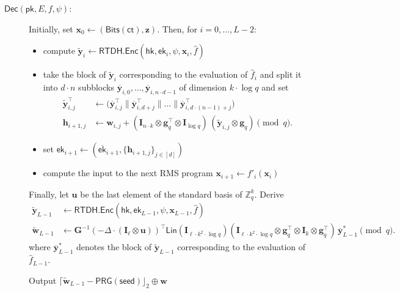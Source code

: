 \documentclass{article}
\newcommand{\ek}{\mathsf{ek}}
\newcommand{\Z}{\mathbb{Z}}
\newcommand{\ct}{\mathsf{ct}}
\newcommand{\RTDH}{\mathsf{RTDH}}
\newcommand{\algofont}[1]{\ensuremath{\mathsf{#1}}}
\newcommand{\Enc}{{\algofont{Enc}}}
\newcommand{\Dec}{{\algofont{Dec}}}
\newcommand{\id}{\ensuremath{\mathbf{I}}}
\newcommand{\pk}{{\mathsf{pk}}}
\newcommand{\hk}{\ensuremath{\mathsf{hk}}}
\newenvironment{protocol}[1][]
{\begin{algorithm}\caption{#1}}
  {\end{algorithm}}
\begin{document}
\begin{protocol}[(cont.)]
\begin{description}
\item[$\Dec(\pk, E, f, \psi)$:]
Initially, set $\mathbf{x}_0\gets (\mathsf{Bits}(\ct), \mathbf{z})$.
Then, for $i=0, \dots, L-2$: 
\begin{itemize}
\item compute $\tilde{\mathbf{y}}_i\gets\RTDH.\Enc(\hk, \ek_i, \psi, \mathbf{x}_i, \hat{f})$
\item take the block of $\tilde{\mathbf{y}}_{i}$ corresponding to the evaluation of $\hat{f}_i$ and split it into $d\cdot n$ subblocks $\overline{\mathbf{y}}_{i, 0}, \dots, \overline{\mathbf{y}}_{i, n\cdot d-1}$ of dimension $k\cdot \log q$ and set
\begin{align*}
\tilde{\mathbf{y}}_{i, j}^\intercal&\gets \bigl(\overline{\mathbf{y}}_{i, j}^\intercal \mathbin{\|} \overline{\mathbf{y}}_{i, d+j}^\intercal \mathbin{\|}\dots \mathbin{\|} \overline{\mathbf{y}}_{i, d\cdot (n-1)+j}^\intercal\bigr)\\
\mathbf{h}_{i+1,j}&\gets \mathbf{w}_{i,j} +(\id_{n\cdot k}\otimes \mathbf{g}_q^\intercal\otimes \id_{\log q})\,(\tilde{\mathbf{y}}_{i,j}\otimes \mathbf{g}_q)\pmod q.\end{align*}
\item set $\ek_{i+1}\gets(\overline{\ek}_{i+1}, \{\mathbf{h}_{i+1, j}\}_{j\in[d]})$
\item compute the input to the next RMS program $\mathbf{x}_{i+1}\gets f'_i(\mathbf{x}_i)$
\end{itemize}
Finally, let $\mathbf{u}$ be the last element of the standard basis of $\Z_q^k$. Derive
\begin{align*}\tilde{\mathbf{y}}_{L-1}&\gets\RTDH.\Enc(\hk, \ek_{L-1}, \psi, \mathbf{x}_{L-1}, \hat{f})\\
\tilde{\mathbf{w}}_{L-1}&\gets \mathbf{G}^{-1}(-\Delta\cdot (\id_\ell\otimes \mathbf u))^\intercal \mathsf{Lin}(\id_{\ell\cdot k^2\cdot \log q}) (\id_{\ell\cdot k^2\cdot \log q}\otimes \mathbf g_q^\intercal\otimes \id_k\otimes \mathbf g_q^\intercal) \,\overline{\mathbf y}_{L-1}^\ast\pmod q.
\end{align*}
where $\overline{\mathbf{y}}_{L-1}^\ast$ denotes the block of $\tilde{\mathbf{y}}_{L-1}$ corresponding to the evaluation of $\hat{f}_{L-1}$.

 Output $\lceil\tilde{\mathbf{w}}_{L-1}-\mathsf{PRG}(\mathsf{seed})\rfloor_2\oplus \mathbf{w}$
\end{description}
\end{protocol}
\end{document}
